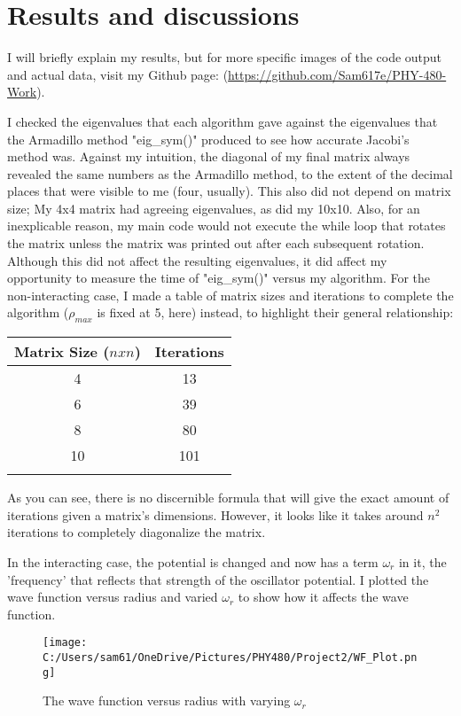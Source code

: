 \documentclass[10pt,showpacs,preprintnumbers,footinbib,amsmath,amssymb,aps,prl,twocolumn,groupedaddress,superscriptaddress,showkeys]{revtex4-1}
\begin{document}
\section{Results and discussions}
I will briefly explain my results, but for more specific images of the code output and actual data, visit my Github page: (\url{https://github.com/Sam617e/PHY-480-Work}).

I checked the eigenvalues that each algorithm gave against the eigenvalues that the Armadillo method "eig\_sym()" produced to see how accurate Jacobi's method was. Against my intuition, the diagonal of my final matrix always revealed the same numbers as the Armadillo method, to the extent of the decimal places that were visible to me (four, usually). This also did not depend on matrix size; My 4x4 matrix had agreeing eigenvalues, as did my 10x10. Also, for an inexplicable reason, my main code would not execute the while loop that rotates the matrix unless the matrix was printed out after each subsequent rotation. Although this did not affect the resulting eigenvalues, it did affect my opportunity to measure the time of "eig\_sym()" versus my algorithm. For the non-interacting case, I made a table of matrix sizes and iterations to complete the algorithm (${\rho_{max}}$ is fixed at 5, here) instead, to highlight their general relationship:

\begin{center}
	\begin{tabular}{cc}
		\hline \hline
			Matrix Size ($n x n$) &  Iterations\\
			\hline
			4 & 13\\
			6 & 39\\
			8 & 80\\
			10 & 101\\
			\hline
			\label{IterationTable}
	\end{tabular}
\end{center}
	
	As you can see, there is no discernible formula that will give the exact amount of iterations given a matrix's dimensions. However, it looks like it takes around $n^{2}$ iterations to completely diagonalize the matrix.

In the interacting case, the potential is changed and now has a term $\omega_{r}$ in it, the 'frequency' that reflects that strength of the oscillator potential. I plotted the wave function versus radius and varied $\omega_{r}$ to show how it affects the wave function.

	\begin{figure}[!ht]
	\centering
	\texttt{[image: C:/Users/sam61/OneDrive/Pictures/PHY480/Project2/WF\_Plot.png]}
	\label{}
	\caption{The wave function versus radius with varying $\omega_{r}$}
\end{figure}
\end{document}
